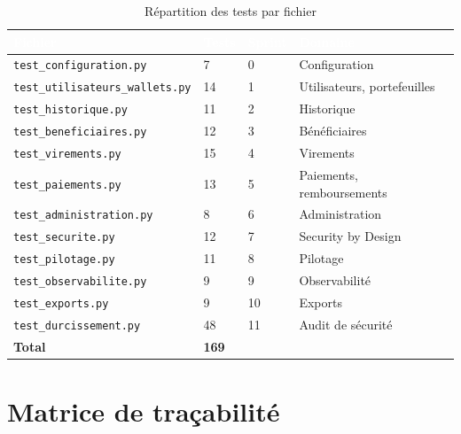 \documentclass[11pt,a4paper]{report}
\newcommand{\entete}{\rowcolor{primaire}}
\newcommand{\tete}[1]{\textcolor{white}{\textbf{#1}}}
\newcommand{\code}[1]{\texttt{\small #1}}
\begin{document}
\begin{table}[H]
\centering
\caption{Répartition des tests par fichier}
\begin{tabularx}{\linewidth}{@{}p{5.2cm}C{1.2cm}C{1.3cm}Y@{}}
\toprule
\entete \tete{Fichier} & \tete{Tests} & \tete{Sprint} & \tete{Domaine} \\
\midrule
\code{test\_configuration.py} & 7 & 0 & Configuration \\
\code{test\_utilisateurs\_wallets.py} & 14 & 1 & Utilisateurs, portefeuilles \\
\code{test\_historique.py} & 11 & 2 & Historique \\
\code{test\_beneficiaires.py} & 12 & 3 & Bénéficiaires \\
\code{test\_virements.py} & 15 & 4 & Virements \\
\code{test\_paiements.py} & 13 & 5 & Paiements, remboursements \\
\code{test\_administration.py} & 8 & 6 & Administration \\
\code{test\_securite.py} & 12 & 7 & Security by Design \\
\code{test\_pilotage.py} & 11 & 8 & Pilotage \\
\code{test\_observabilite.py} & 9 & 9 & Observabilité \\
\code{test\_exports.py} & 9 & 10 & Exports \\
\code{test\_durcissement.py} & 48 & 11 & Audit de sécurité \\
\midrule
\textbf{Total} & \textbf{169} & & \\
\bottomrule
\end{tabularx}
\end{table}

\section{Matrice de traçabilité}
\label{sec:tracabilite}
\end{document}
